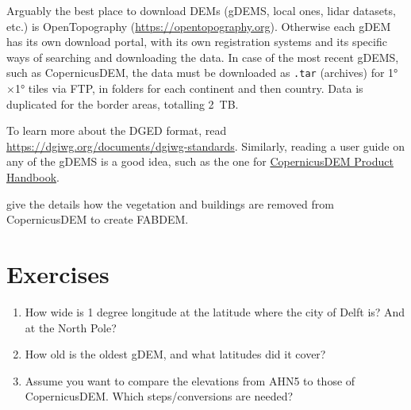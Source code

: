 Arguably the best place to download DEMs (gDEMS, local ones, lidar datasets, etc.) is OpenTopography (\url{https://opentopography.org}).
Otherwise each gDEM has its own download portal, with its own registration systems and its specific ways of searching and downloading the data.
In case of the most recent gDEMS, such as CopernicusDEM, the data must be downloaded as \texttt{.tar} (archives) for \ang{1}$\times$\ang{1} tiles via FTP, in folders for each continent and then country.
Data is duplicated for the border areas, totalling \qty{2}{TB}.

To learn more about the DGED format, read \url{https://dgiwg.org/documents/dgiwg-standards}.
Similarly, reading a user guide on any of the gDEMS is a good idea, such as the one for \href{https://spacedata.copernicus.eu/documents/20126/0/GEO1988-CopernicusDEM-SPE-002_ProductHandbook_I3.0+%281%29.pdf}{CopernicusDEM Product Handbook}.

\citet{Hawker22} give the details how the vegetation and buildings are removed from CopernicusDEM to create FABDEM\@.

%
\section{Exercises}

\begin{enumerate}
  \item How wide is 1 degree longitude at the latitude where the city of Delft is? And at the North Pole?
  \item How old is the oldest gDEM, and what latitudes did it cover?
  \item Assume you want to compare the elevations from AHN5 to those of CopernicusDEM\@. Which steps/conversions are needed?
\end{enumerate}
